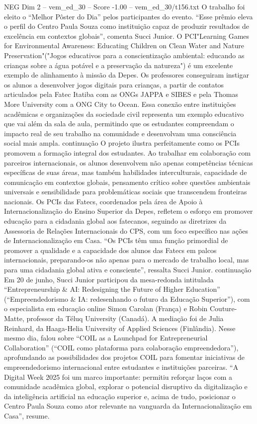 \begin{textsample}{NEG Dim 2 – vem\_ed\_30 – Score -1.00 – vem\_ed\_30/t156.txt}
O trabalho foi eleito o “Melhor Pôster do Dia” pelos participantes do evento. “Esse prêmio eleva o perfil do Centro Paula Souza como instituição capaz de produzir resultados de excelência em contextos globais”, comenta Succi Junior.
O PCI"Learning Games for Environmental Awareness: Educating Children on Clean Water and Nature Preservation"("Jogos educativos para a conscientização ambiental: educando as crianças sobre a água potável e a preservação da natureza") é um excelente exemplo de alinhamento à missão da Depes.
Os professores conseguiram instigar os alunos a desenvolver jogos digitais para crianças, a partir de contatos articulados pela Fatec Itatiba com as ONGs JAPPA e SIBES e pela Thomas More University com a ONG City to Ocean.
Essa conexão entre instituições acadêmicas e organizações da sociedade civil representa um exemplo educativo que vai além da sala de aula, permitindo que os estudantes compreendam o impacto real de seu trabalho na comunidade e desenvolvam uma consciência social mais ampla. continuação O projeto ilustra perfeitamente como os PCIs promovem a formação integral dos estudantes.
Ao trabalhar em colaboração com parceiros internacionais, os alunos desenvolvem não apenas competências técnicas específicas de suas áreas, mas também habilidades interculturais, capacidade de comunicação em contextos globais, pensamento crítico sobre questões ambientais universais e sensibilidade para problemáticas sociais que transcendem fronteiras nacionais.
Os PCIs das Fatecs, coordenados pela área de Apoio à Internacionalização do Ensino Superior da Depes, refletem o esforço em promover educação para a cidadania global aos fatecanos, seguindo as diretrizes da Assessoria de Relações Internacionais do CPS, com um foco específico nas ações de Internacionalização em Casa. “Os PCIs têm uma função primordial de promover a qualidade e a capacidade dos alunos das Fatecs em palcos internacionais, preparando-os não apenas para o mercado de trabalho local, mas para uma cidadania global ativa e consciente”, ressalta Succi Junior. continuação Em 20 de junho, Succi Junior participou da mesa-redonda intitulada “Entrepreneurship \& AI: Redesigning the Future of Higher Education” (“Empreendedorismo \& IA: redesenhando o futuro da Educação Superior”), com o especialista em educação online Simon Carolan (França) e Robin Couture-Matte, professor da Téluq University (Canadá).
A mediação foi de Julia Reinhard, da Haaga-Helia University of Applied Sciences (Finlândia).
Nesse mesmo dia, falou sobre “COIL as a Launchpad for Entrepreneurial Collaboration” (“COIL como plataforma para colaboração empreendedora”), aprofundando as possibilidades dos projetos COIL para fomentar iniciativas de empreendedorismo internacional entre estudantes e instituições parceiras. “A Digital Week 2025 foi um marco importante: permitiu reforçar laços com a comunidade acadêmica global, explorar o potencial disruptivo da digitalização e da inteligência artificial na educação superior e, acima de tudo, posicionar o Centro Paula Souza como ator relevante na vanguarda da Internacionalização em Casa”, resume.

\end{textsample}
